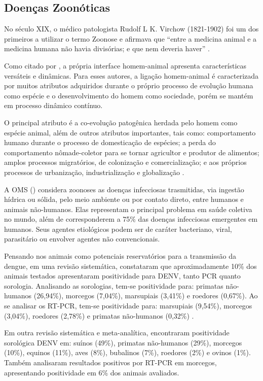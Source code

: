 \subsection{Doenças Zoonóticas}

\indent No século XIX, o médico patologista Rudolf L K. Virchow (1821-1902) foi um dos primeiros a utilizar o termo Zoonose e afirmava que “entre a medicina animal e a medicina humana não havia divisórias; e que nem deveria haver” \cite{CFMVSaude}.

\indent Como citado por , a própria interface homem-animal apresenta características versáteis e dinâmicas. Para esses autores, a ligação homem-animal é caracterizada por muitos atributos adquiridos durante o próprio processo de evolução humana como espécie e o desenvolvimento do homem como sociedade, porém se mantém em processo dinâmico contínuo.

\indent O principal atributo é a co-evolução patogênica herdada pelo homem como espécie animal, além de outros atributos importantes, tais como: comportamento humano durante o processo de domesticação de espécies; a perda do comportamento nômade-coletor para se tornar agricultor e produtor de alimentos; amplos processos migratórios, de colonização e comercialização;  e aos próprios processos de urbanização, industrialização e globalização \cite{HumanAnimalInterface}.

\indent A \acrshort{OMS} (\citeyear{WHO2020Zoonoses}) considera zoonoses as doenças infecciosas trasmitidas, via ingestão hídrica ou sólida, pelo meio ambiente ou por contato direto, entre humanos e animais não-humanos. Elas representam o principal problema em saúde coletiva no mundo, além de corresponderem a 75\% das doenças infecciosas emergentes em humanos. Seus agentes etiológicos podem ser de caráter bacteriano, viral, parasitário ou envolver agentes não convencionais.

\indent Pensando nos animais como potenciais reservatórios para a transmissão da dengue, em uma revisão sistemática, constataram que aproximadamente 10\% dos animais testados apresentaram positividade para \acrshort{DENV}, tanto PCR quanto sorologia. Analisando as sorologias, tem-se positividade para: primatas não-humanos (26,94\%), morcegos (7,04\%), marsupiais (3,41\%) e roedores (0,67\%). Ao se analisar os RT-PCR, tem-se positividade para:  marsupiais (9,54\%), morcegos (3,04\%), roedores (2,78\%) e primatas não-humanos (0,32\%)  \cite{DengueAnimalsGwee2021}.

\indent Em outra revisão sistemática e meta-analítica,  encontraram positividade sorológica \acrshort{DENV} em: suínos (49\%), primatas não-humanos (29\%), morcegos (10\%), equinos (11\%), aves (8\%), bubalinos (7\%), roedores (2\%) e ovinos (1\%). Também analisaram resultados positivos por RT-PCR em morcegos, apresentando positividade em 6\% dos animais avaliados.

